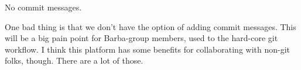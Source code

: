 No commit messages.

One bad thing is that we don't have the option of adding commit messages. This will be a big pain point for Barba-group members, used to the hard-core git workflow. I think this platform has some benefits for collaborating with non-git folks, though. There are a lot of those.
